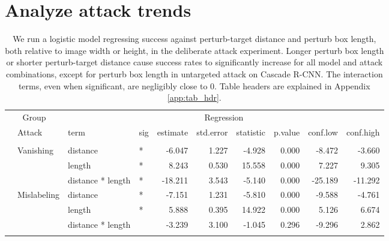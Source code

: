 \section{Analyze attack trends}\label{analyze-attack-trends}

\begingroup\fontsize{9}{11}\selectfont

\begin{longtable}[t]{llllrrrrrr}
\caption{\label{tab:arbitrary_trend_table}We run a logistic model regressing success against perturb-target distance and perturb box length, both relative to image width or height, in the deliberate attack experiment. Longer perturb box length or shorter perturb-target distance cause success rates to significantly increase for all model and attack combinations, except for perturb box length in untargeted attack on Cascade R-CNN. The interaction terms, even when significant, are negligibly close to 0. Table headers are explained in Appendix \ref{app:tab_hdr}.}\\
\toprule
\multicolumn{2}{c}{Group} & \multicolumn{8}{c}{Regression} \\
\cmidrule(l{3pt}r{3pt}){1-2} \cmidrule(l{3pt}r{3pt}){3-10}
 & Attack & term & sig & estimate & std.error & statistic & p.value & conf.low & conf.high\\
\midrule
\addlinespace[0.3em]
\multicolumn{10}{l}{\textbf{YOLOv3}}\\
\hspace{1em} & Vanishing & distance & * & -6.047 & 1.227 & -4.928 & 0.000 & -8.472 & -3.660\\
\cmidrule{3-10}\nopagebreak
\hspace{1em} &  & length & * & 8.243 & 0.530 & 15.558 & 0.000 & 7.227 & 9.305\\
\cmidrule{3-10}\nopagebreak
\hspace{1em} &  & distance * length & * & -18.211 & 3.543 & -5.140 & 0.000 & -25.189 & -11.292\\
\cmidrule{2-10}\nopagebreak
\hspace{1em} & Mislabeling & distance & * & -7.151 & 1.231 & -5.810 & 0.000 & -9.588 & -4.761\\
\cmidrule{3-10}\nopagebreak
\hspace{1em} &  & length & * & 5.888 & 0.395 & 14.922 & 0.000 & 5.126 & 6.674\\
\cmidrule{3-10}\nopagebreak
\hspace{1em} &  & distance * length &  & -3.239 & 3.100 & -1.045 & 0.296 & -9.296 & 2.862\\
\cmidrule{2-10}\nopagebreak

\end{longtable}
